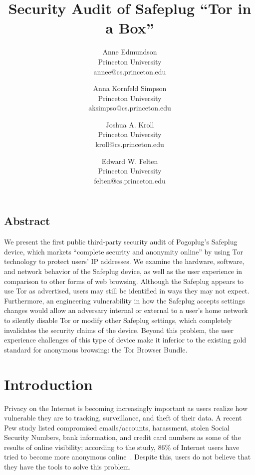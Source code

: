 \documentclass[letterpaper,twocolumn,10pt]{article}
\begin{document}
\date{}

\title{\Large \bf Security Audit of Safeplug ``Tor in a Box''}
\author{
 {\rm Anne Edmundson}\\
 Princeton University\\
 annee@cs.princeton.edu
 \and
 {\rm Anna Kornfeld Simpson}\\
 Princeton University\\
 aksimpso@cs.princeton.edu
 \and
 {\rm Joshua A. Kroll}\\
 Princeton University\\
 kroll@cs.princeton.edu
 \and
 {\rm Edward W. Felten}\\
 Princeton University\\
 felten@cs.princeton.edu
} %

\maketitle


\subsection*{Abstract}
We present the first public third-party security audit of Pogoplug's Safeplug device, which markets ``complete security and anonymity online'' by using Tor technology to protect users' IP addresses.  We examine the hardware, software, and network behavior of the Safeplug device, as well as the user experience in comparison to other forms of web browsing.  Although the Safeplug appears to use Tor as advertised, users may still be identified in ways they may not expect.  Furthermore, an engineering vulnerability in how the Safeplug accepts settings changes would allow an adversary internal or external to a user's home network to silently disable Tor or modify other Safeplug settings, which completely invalidates the security claims of the device.  Beyond this problem, the user experience challenges of this type of device make it inferior to the existing gold standard for anonymous browsing: the Tor Browser Bundle.


\section{Introduction}
Privacy on the Internet is becoming increasingly important as users realize how vulnerable they are to tracking, surveillance, and theft of their data.  A recent Pew study listed compromised emails/accounts, harassment, stolen Social Security Numbers, bank information, and credit card numbers as some of the results of online visibility; according to the study, 86\% of Internet users have tried to become more anonymous online~\cite{pew}.  Despite this, users do not believe that they have the tools to solve this problem.
\end{document}
